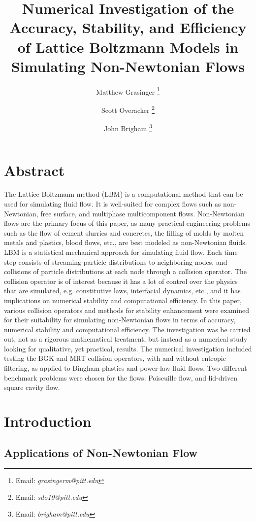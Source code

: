 \documentclass{article}
\title{Numerical Investigation of the Accuracy, Stability, and Efficiency of Lattice Boltzmann Models in Simulating Non-Newtonian Flows}
\author{{Matthew Grasinger}
\thanks{Email: \textit{grasingerm@pitt.edu}}}
\author{{Scott Overacker}
\thanks{Email: \textit{sdo10@pitt.edu}}}
\author{John Brigham
\thanks{Email: \textit{brigham@pitt.edu}}}
\affil{Civil and Environmental Engineering Department, University of Pittsburgh}
\begin{document}
\maketitle
\newpage
\tableofcontents
\newpage
{}

\section*{Abstract}

The Lattice Boltzmann method (LBM) is a computational method that can be used for simulating fluid flow.
It is well-suited for complex flows such as non-Newtonian, free surface, and multiphase multicomponent flows.
Non-Newtonian flows are the primary focus of this paper, as many practical engineering problems such as the flow of cement slurries and concretes, the filling of molds by molten metals and plastics, blood flows, etc., are best modeled as non-Newtonian fluids.
LBM is a statistical mechanical approach for simulating fluid flow.
Each time step consists of streaming particle distributions to neighboring nodes, and collisions of particle distributions at each node through a collision operator.
The collision operator is of interest because it has a lot of control over the physics that are simulated, e.g. constitutive laws, interfacial dynamics, etc., and it has implications on numerical stability and computational efficiency.
In this paper, various collision operators and methods for stability enhancement were examined for their suitability for simulating non-Newtonian flows in terms of accuracy, numerical stability and computational efficiency.
The investigation was be carried out, not as a rigorous mathematical treatment, but instead as a numerical study looking for qualitative, yet practical, results.
The numerical investigation included testing the BGK and MRT collision operators, with and without entropic filtering, as applied to Bingham plastics and power-law fluid flows.
Two different benchmark problems were chosen for the flows: Poiseuille flow, and lid-driven square cavity flow.

\section{Introduction} %

\subsection{Applications of Non-Newtonian Flow}
\end{document}
